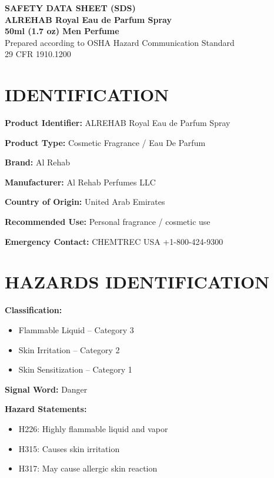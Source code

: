 \documentclass[11pt]{article}
\begin{document}
\begin{center}
{\LARGE \textbf{SAFETY DATA SHEET (SDS)}}\\[6pt]
{\Large \textbf{ALREHAB Royal Eau de Parfum Spray}}\\
{\large \textbf{50ml (1.7 oz) Men Perfume}}\\[6pt]
Prepared according to OSHA Hazard Communication Standard\\
29 CFR 1910.1200
\end{center}

\vspace{10pt}

\section{IDENTIFICATION}

\textbf{Product Identifier:} ALREHAB Royal Eau de Parfum Spray

\textbf{Product Type:} Cosmetic Fragrance / Eau De Parfum

\textbf{Brand:} Al Rehab

\textbf{Manufacturer:} Al Rehab Perfumes LLC

\textbf{Country of Origin:} United Arab Emirates

\textbf{Recommended Use:} Personal fragrance / cosmetic use

\textbf{Emergency Contact:} CHEMTREC USA +1-800-424-9300

\section{HAZARDS IDENTIFICATION}

\textbf{Classification:}
\begin{itemize}[noitemsep]
    \item Flammable Liquid -- Category 3
    \item Skin Irritation -- Category 2
    \item Skin Sensitization -- Category 1
\end{itemize}

\textbf{Signal Word:} Danger

\textbf{Hazard Statements:}
\begin{itemize}[noitemsep]
    \item H226: Highly flammable liquid and vapor
    \item H315: Causes skin irritation
    \item H317: May cause allergic skin reaction
\end{itemize}
\end{document}
